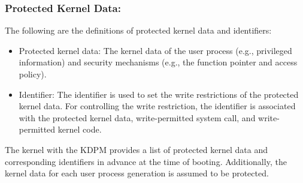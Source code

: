 \subsubsection{Protected Kernel Data:}

The following are the definitions of protected kernel data and identifiers:



\begin{itemize}
  
\item Protected kernel data: The kernel data of the user process (e.g.,
privileged information) and security mechanisms (e.g., the function pointer
and access policy).

\item Identifier: The identifier is used to set the write restrictions of the
protected kernel data. For controlling the write restriction, the identifier is
associated with the protected kernel data, write-permitted system call, and
write-permitted kernel code.

  
\end{itemize}


The kernel with the KDPM provides a list of protected kernel data and
corresponding identifiers in advance at the time of booting.
%
Additionally, the kernel data for each user process generation is assumed to be
protected.

